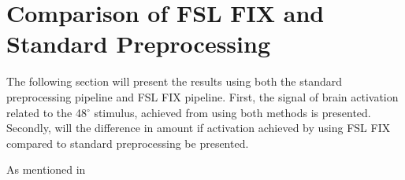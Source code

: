 \section{Comparison of FSL FIX and Standard Preprocessing}

The following section will present the results using both the standard preprocessing pipeline and FSL FIX pipeline. First, the signal of brain activation related to the 48$^\circ$ stimulus, achieved from using both methods is presented. Secondly, will the difference in amount if activation achieved by using FSL FIX compared to standard preprocessing be presented. 

As mentioned in    